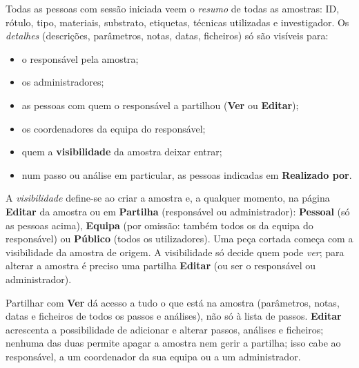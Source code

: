 \documentclass[11pt,a4paper]{article}
\newcommand{\ui}[1]{\textsf{\textbf{#1}}}
\begin{document}
Todas as pessoas com sessão iniciada veem o \emph{resumo} de todas as
amostras: ID, rótulo, tipo, materiais, substrato, etiquetas, técnicas
utilizadas e investigador. Os \emph{detalhes} (descrições, parâmetros,
notas, datas, ficheiros) só são visíveis para:
\begin{itemize}
  \item o responsável pela amostra;
  \item os administradores;
  \item as pessoas com quem o responsável a partilhou (\ui{Ver} ou \ui{Editar});
  \item os coordenadores da equipa do responsável;
  \item quem a \ui{visibilidade} da amostra deixar entrar;
  \item num passo ou análise em particular, as pessoas indicadas em
        \ui{Realizado por}.
\end{itemize}

A \emph{visibilidade} define-se ao criar a amostra e, a qualquer momento,
na página \ui{Editar} da amostra ou em \ui{Partilha} (responsável ou
administrador): \ui{Pessoal} (só
as pessoas acima), \ui{Equipa} (por omissão: também todos os da equipa do responsável) ou
\ui{Público} (todos os utilizadores). Uma peça cortada começa com a
visibilidade da amostra de origem. A visibilidade só decide quem pode
\emph{ver}; para alterar a amostra é preciso uma partilha \ui{Editar} (ou ser
o responsável ou administrador).

Partilhar com \ui{Ver} dá acesso a tudo o que está na amostra (parâmetros,
notas, datas e ficheiros de todos os passos e análises), não só à lista de
passos. \ui{Editar} acrescenta a possibilidade de adicionar e alterar passos,
análises e ficheiros; nenhuma das duas permite apagar a amostra nem gerir a
partilha; isso cabe ao responsável, a um coordenador da sua equipa ou a um administrador.
\end{document}
